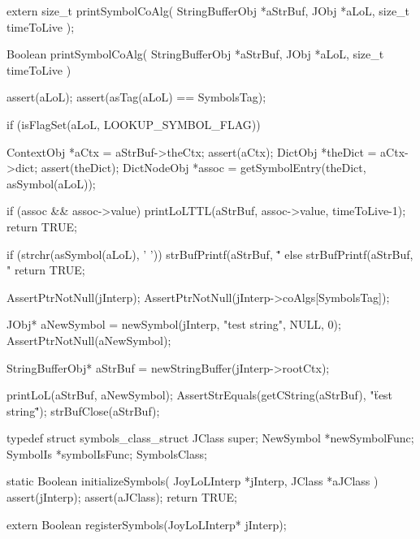 
\startCHeader
extern size_t printSymbolCoAlg(
  StringBufferObj *aStrBuf,
  JObj            *aLoL,
  size_t           timeToLive
);
\stopCHeader
{}

\startCCode
Boolean printSymbolCoAlg(
  StringBufferObj *aStrBuf,
  JObj            *aLoL,
  size_t           timeToLive
) {
  assert(aLoL);
  assert(asTag(aLoL) == SymbolsTag);

  if (isFlagSet(aLoL, LOOKUP_SYMBOL_FLAG)) {
    ContextObj  *aCtx    = aStrBuf->theCtx;
    assert(aCtx);
    DictObj     *theDict = aCtx->dict;
    assert(theDict);
    DictNodeObj *assoc   =
      getSymbolEntry(theDict, asSymbol(aLoL));
  
    if (assoc && assoc->value) {
      printLoLTTL(aStrBuf, assoc->value, timeToLive-1);
      return TRUE;
    }
  }

  if (strchr(asSymbol(aLoL), ' ')) {
    strBufPrintf(aStrBuf, "\"%
  } else {
    strBufPrintf(aStrBuf, "%
  }
  return TRUE;
}
\stopCCode


\startCTest
  AssertPtrNotNull(jInterp);
  AssertPtrNotNull(jInterp->coAlgs[SymbolsTag]);

  JObj* aNewSymbol = newSymbol(jInterp, "test string", NULL, 0);
  AssertPtrNotNull(aNewSymbol);
  
  StringBufferObj* aStrBuf = newStringBuffer(jInterp->rootCtx);
  
  printLoL(aStrBuf, aNewSymbol);
  AssertStrEquals(getCString(aStrBuf),
    "\"test string\" ");
  strBufClose(aStrBuf);
\stopCTest
\stopTestCase
\stopTestSuite

\startTestSuite[registerSymbols]

\startCHeader
typedef struct symbols_class_struct {
  JClass  super;
  NewSymbol  *newSymbolFunc;
  SymbolIs   *symbolIsFunc;
} SymbolsClass;
\stopCHeader

\startCCode
static Boolean initializeSymbols(
  JoyLoLInterp *jInterp,
  JClass   *aJClass
) {
  assert(jInterp);
  assert(aJClass);
  return TRUE;
}
\stopCCode

\startCHeader
extern Boolean registerSymbols(JoyLoLInterp* jInterp);
\stopCHeader
{}

